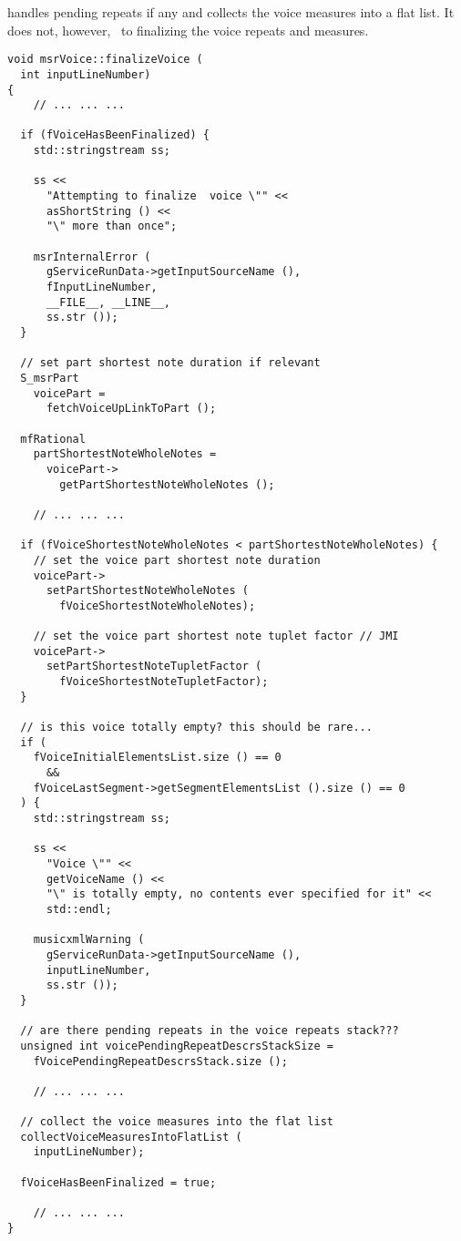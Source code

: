  handles pending repeats if any and collects the voice measures into a flat list. It does not, however, \cascade\ to finalizing the voice repeats and measures.
\begin{lstlisting}[language=CPlusPlus]
void msrVoice::finalizeVoice (
  int inputLineNumber)
{
	// ... ... ...

  if (fVoiceHasBeenFinalized) {
    std::stringstream ss;

    ss <<
      "Attempting to finalize  voice \"" <<
      asShortString () <<
      "\" more than once";

    msrInternalError (
      gServiceRunData->getInputSourceName (),
      fInputLineNumber,
      __FILE__, __LINE__,
      ss.str ());
  }

  // set part shortest note duration if relevant
  S_msrPart
    voicePart =
      fetchVoiceUpLinkToPart ();

  mfRational
    partShortestNoteWholeNotes =
      voicePart->
        getPartShortestNoteWholeNotes ();

	// ... ... ...

  if (fVoiceShortestNoteWholeNotes < partShortestNoteWholeNotes) {
    // set the voice part shortest note duration
    voicePart->
      setPartShortestNoteWholeNotes (
        fVoiceShortestNoteWholeNotes);

    // set the voice part shortest note tuplet factor // JMI
    voicePart->
      setPartShortestNoteTupletFactor (
        fVoiceShortestNoteTupletFactor);
  }

  // is this voice totally empty? this should be rare...
  if (
    fVoiceInitialElementsList.size () == 0
      &&
    fVoiceLastSegment->getSegmentElementsList ().size () == 0
  ) {
    std::stringstream ss;

    ss <<
      "Voice \"" <<
      getVoiceName () <<
      "\" is totally empty, no contents ever specified for it" <<
      std::endl;

    musicxmlWarning (
      gServiceRunData->getInputSourceName (),
      inputLineNumber,
      ss.str ());
  }

  // are there pending repeats in the voice repeats stack???
  unsigned int voicePendingRepeatDescrsStackSize =
    fVoicePendingRepeatDescrsStack.size ();

	// ... ... ...

  // collect the voice measures into the flat list
  collectVoiceMeasuresIntoFlatList (
    inputLineNumber);

  fVoiceHasBeenFinalized = true;

	// ... ... ...
}
\end{lstlisting}


